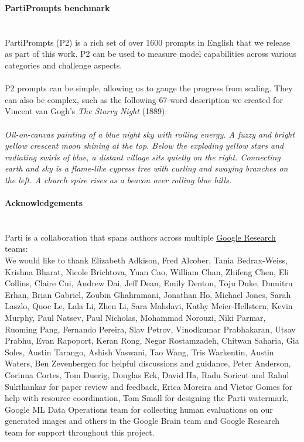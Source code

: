 \documentclass{article}
\begin{document}
{\noindent \LARGE \textbf{PartiPrompts benchmark}}\\\\
\\
PartiPrompts (P2) is a rich set of over 1600 prompts in English that we release as part of this work. P2 can be used to measure model capabilities across various categories and challenge aspects.\\
\\
P2 prompts can be simple, allowing us to gauge the progress from scaling. They can also be complex, such as the following 67-word description we created for Vincent van Gogh’s \textit{The Starry Night} (1889):\\
\\
\textit{Oil-on-canvas painting of a blue night sky with roiling energy. A fuzzy and bright yellow crescent moon shining at the top. Below the exploding yellow stars and radiating swirls of blue, a distant village sits quietly on the right. Connecting earth and sky is a flame-like cypress tree with curling and swaying branches on the left. A church spire rises as a beacon over rolling blue hills.}\\
\\
{\noindent \LARGE \textbf{Acknowledgements}}\\\\
\\
Parti is a collaboration that spans authors across multiple \href{https://research.google/}{Google Research} teams:\\
We would like to thank Elizabeth Adkison, Fred Alcober, Tania Bedrax-Weiss, Krishna Bharat, Nicole Brichtova, Yuan Cao, William Chan, Zhifeng Chen, Eli Collins, Claire Cui, Andrew Dai, Jeff Dean, Emily Denton, Toju Duke, Dumitru Erhan, Brian Gabriel, Zoubin Ghahramani, Jonathan Ho, Michael Jones, Sarah Laszlo, Quoc Le, Lala Li, Zhen Li, Sara Mahdavi, Kathy Meier-Hellstern, Kevin Murphy, Paul Natsev, Paul Nicholas, Mohammad Norouzi, Niki Parmar, Ruoming Pang, Fernando Pereira, Slav Petrov, Vinodkumar Prabhakaran, Utsav Prabhu, Evan Rapoport, Keran Rong, Negar Rostamzadeh, Chitwan Saharia, Gia Soles, Austin Tarango, Ashish Vaswani, Tao Wang, Tris Warkentin, Austin Waters, Ben Zevenbergen for helpful discussions and guidance, Peter Anderson, Corinna Cortes, Tom Duerig, Douglas Eck, David Ha, Radu Soricut and Rahul Sukthankar for paper review and feedback, Erica Moreira and Victor Gomes for help with resource coordination, Tom Small for designing the Parti watermark, Google ML Data Operations team for collecting human evaluations on our generated images and others in the Google Brain team and Google Research team for support throughout this project.\\
\end{document}
